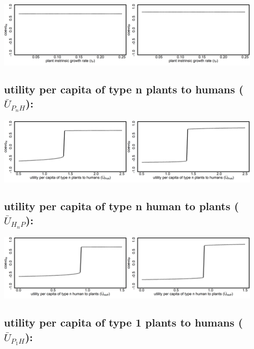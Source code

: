 \documentclass[]{book}
\begin{document}
\includegraphics[width=1\linewidth]{plots/2_onePar-r.P_bifplot-pair}

\hypertarget{utility-per-capita-of-type-n-plants-to-humans-baru_p_nh-1}{%
\subsection{\texorpdfstring{utility per capita \textbf{of} type n plants \textbf{to} humans (\(\bar{U}_{P_{n}H}\)):}{utility per capita of type n plants to humans (\textbackslash{}bar\{U\}\_\{P\_\{n\}H\}):}}\label{utility-per-capita-of-type-n-plants-to-humans-baru_p_nh-1}}

\includegraphics[width=1\linewidth]{plots/2_onePar-mU.PnH_bifplot-pair}

\hypertarget{utility-per-capita-of-type-n-human-to-plants-baru_h_np}{%
\subsection{\texorpdfstring{utility per capita \textbf{of} type n human \textbf{to} plants (\(\bar{U}_{H_{n}P}\)):}{utility per capita of type n human to plants (\textbackslash{}bar\{U\}\_\{H\_\{n\}P\}):}}\label{utility-per-capita-of-type-n-human-to-plants-baru_h_np}}

\includegraphics[width=1\linewidth]{plots/2_onePar-mU.HnP_bifplot-pair}

\hypertarget{utility-per-capita-of-type-1-plants-to-humans-baru_p_1h}{%
\subsection{\texorpdfstring{utility per capita \textbf{of} type 1 plants \textbf{to} humans (\(\bar{U}_{P_{1}H}\)):}{utility per capita of type 1 plants to humans (\textbackslash{}bar\{U\}\_\{P\_\{1\}H\}):}}\label{utility-per-capita-of-type-1-plants-to-humans-baru_p_1h}}
\end{document}
